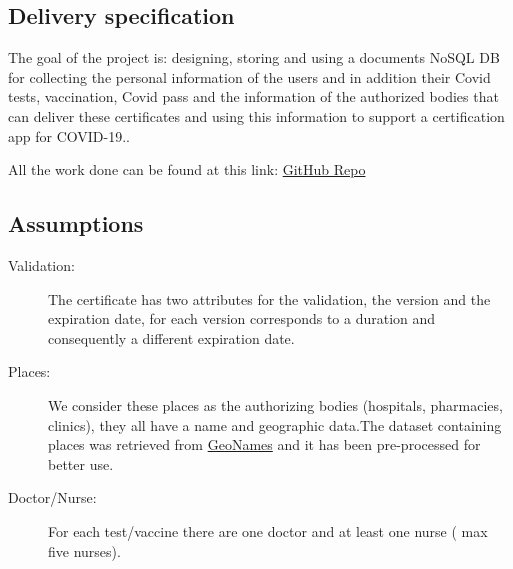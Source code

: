 \documentclass[table, 12pt]{article}
\begin{document}
\subsection{Delivery specification}
The goal of the project is: designing, storing and using a documents NoSQL DB for collecting the personal information of the users and in addition their Covid tests, vaccination, Covid pass and the information of the authorized bodies that can deliver these certificates and using this information to support a certification app for COVID-19.. 





All the work done can be found at this link:
\href{https://github.com/pollomarzo/SAMBUD_proj2}{GitHub Repo}

\subsection{Assumptions}

\begin{description}
\item[Validation:] The certificate has two attributes for the validation, the version and the expiration date, for each version corresponds to a duration and consequently a different expiration date.
\item[Places:]We consider these places as the authorizing bodies (hospitals, pharmacies, clinics), they all have a name and geographic data.The dataset containing places was retrieved from \href{http://download.geonames.org/export/dump/}{GeoNames} and it has been pre-processed for better use. 
\item[Doctor/Nurse:] For each test/vaccine there are one doctor and at least one nurse ( max five nurses). 
 
\end{description} 
\newpage
\end{document}
